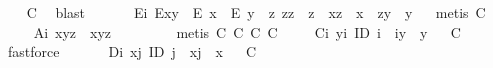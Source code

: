 \begin{isabellebody}
\isadelimproof
\ \ %
\endisadelimproof
%
\isatagproof
{}\isamarkupfalse%
\ C\ \isamarkupfalse%
\ blast%
\endisatagproof
{\isafoldproof}%
%
\isadelimproof
%
\endisadelimproof
\ \isanewline
\ \ \ \isamarkupfalse%
\ E\isactrlsub i{\isacharcolon}\ {\isachardoublequoteopen}E{\isacharparenleft}x{\isasymcdot}y{\isacharparenright}\ \isactrlbold {\isasymleftarrow}\ {\isacharparenleft}E\ x\ \isactrlbold {\isasymand}\ E\ y\ \isactrlbold {\isasymand}\ {\isacharparenleft}\isactrlbold {\isasymexists}z{\isachardot}\ z{\isasymcdot}z\ {\isasymcong}\ z\ \isactrlbold {\isasymand}\ x{\isasymcdot}z\ {\isasymcong}\ x\ \isactrlbold {\isasymand}\ z{\isasymcdot}y\ {\isasymcong}\ y{\isacharparenright}{\isacharparenright}{\isachardoublequoteclose}%
\isadelimproof
\ %
\endisadelimproof
%
\isatagproof
{}\isamarkupfalse%
\ {\isacharparenleft}metis\ C%
\endisatagproof
{\isafoldproof}%
%
\isadelimproof
%
\endisadelimproof
\ \isanewline
\ \ \ \isamarkupfalse%
\ A\isactrlsub i{\isacharcolon}\ {\isachardoublequoteopen}x{\isasymcdot}{\isacharparenleft}y{\isasymcdot}z{\isacharparenright}\ {\isasymcong}\ {\isacharparenleft}x{\isasymcdot}y{\isacharparenright}{\isasymcdot}z{\isachardoublequoteclose}%
\isadelimproof
\ \ \ \ \ \ \ %
\endisadelimproof
%
\isatagproof
{}\isamarkupfalse%
\ {\isacharparenleft}metis\ C\ C\ C\ C%
\endisatagproof
{\isafoldproof}%
%
\isadelimproof
%
\endisadelimproof
\isanewline
\ \ \ \isamarkupfalse%
\ C\isactrlsub i{\isacharcolon}\ {\isachardoublequoteopen}\isactrlbold {\isasymforall}y{\isachardot}\isactrlbold {\isasymexists}i{\isachardot}\ ID\ i\ \isactrlbold {\isasymand}\ i{\isasymcdot}y\ {\isasymcong}\ y{\isachardoublequoteclose}%
\isadelimproof
\ %
\endisadelimproof
%
\isatagproof
{}\isamarkupfalse%
\ C\ \isamarkupfalse%
\ fastforce%
\endisatagproof
{\isafoldproof}%
%
\isadelimproof
%
\endisadelimproof
\ \isanewline
\ \ \ \isamarkupfalse%
\ D\isactrlsub i{\isacharcolon}\ {\isachardoublequoteopen}\isactrlbold {\isasymforall}x{\isachardot}\isactrlbold {\isasymexists}j{\isachardot}\ ID\ j\ \isactrlbold {\isasymand}\ x{\isasymcdot}j\ {\isasymcong}\ x{\isachardoublequoteclose}%
\isadelimproof
\ %
\endisadelimproof
%
\isatagproof
{}\isamarkupfalse%
\ C\ \isamarkupfalse%

\end{isabellebody}
